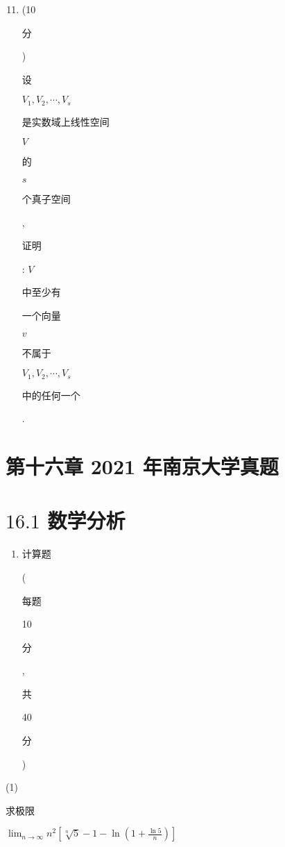 \documentclass[10pt]{article}
\begin{document}
\begin{enumerate}
  \setcounter{enumi}{10}
  \item (10 \begin{CJK}{UTF8}{mj}分\end{CJK}) \begin{CJK}{UTF8}{mj}设\end{CJK} $V_{1}, V_{2}, \cdots, V_{s}$ \begin{CJK}{UTF8}{mj}是实数域上线性空间\end{CJK} $V$ \begin{CJK}{UTF8}{mj}的\end{CJK} $s$ \begin{CJK}{UTF8}{mj}个真子空间\end{CJK}, \begin{CJK}{UTF8}{mj}证明\end{CJK}: $V$ \begin{CJK}{UTF8}{mj}中至少有\end{CJK} \begin{CJK}{UTF8}{mj}一个向量\end{CJK} $v$ \begin{CJK}{UTF8}{mj}不属于\end{CJK} $V_{1}, V_{2}, \cdots, V_{s}$ \begin{CJK}{UTF8}{mj}中的任何一个\end{CJK}.
\end{enumerate}
\section{第十六章 2021 年南京大学真题}
\section{$16.1$ 数学分析}
\begin{enumerate}
  \item \begin{CJK}{UTF8}{mj}计算题\end{CJK} (\begin{CJK}{UTF8}{mj}每题\end{CJK} 10 \begin{CJK}{UTF8}{mj}分\end{CJK}, \begin{CJK}{UTF8}{mj}共\end{CJK} 40 \begin{CJK}{UTF8}{mj}分\end{CJK})
\end{enumerate}
(1) \begin{CJK}{UTF8}{mj}求极限\end{CJK} $\lim _{n \rightarrow \infty} n^{2}\left[\sqrt[n]{5}-1-\ln \left(1+\frac{\ln 5}{n}\right)\right]$
\end{document}
